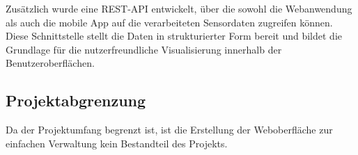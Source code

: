 	Zusätzlich wurde eine \ac{REST}-\ac{API} entwickelt, über die sowohl die Webanwendung als auch die mobile App
	auf die verarbeiteten Sensordaten zugreifen können. Diese Schnittstelle stellt die Daten in strukturierter Form bereit
	und bildet die Grundlage für die nutzerfreundliche Visualisierung innerhalb der Benutzeroberflächen.


\subsection{Projektabgrenzung} 
\label{sec:Projektabgrenzung}
	Da der Projektumfang begrenzt ist, ist die Erstellung der Weboberfläche zur einfachen Verwaltung kein Bestandteil des Projekts.
